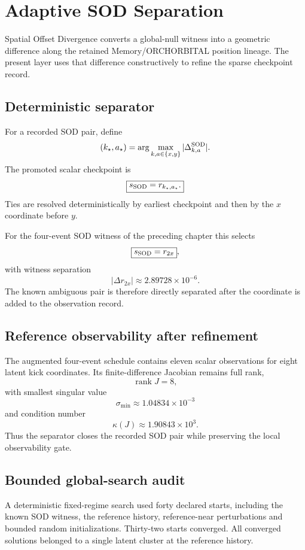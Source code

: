 \chapter{Adaptive SOD Separation}

Spatial Offset Divergence converts a global-null witness into a geometric difference along the retained Memory/ORCHORBITAL position lineage. The present layer uses that difference constructively to refine the sparse checkpoint record.

\section{Deterministic separator}

For a recorded SOD pair, define
\[
(k_\star,a_\star)=\arg\max_{k,a\in\{x,y\}}|\Delta^{\rm SOD}_{k,a}|.
\]
The promoted scalar checkpoint is
\[
\boxed{s_{\rm SOD}=r_{k_\star,a_\star}.}
\]
Ties are resolved deterministically by earliest checkpoint and then by the $x$ coordinate before $y$.

For the four-event SOD witness of the preceding chapter this selects
\[
\boxed{s_{\rm SOD}=r_{2x}},
\]
with witness separation
\[
|\Delta r_{2x}|\approx2.89728\times10^{-6}.
\]
The known ambiguous pair is therefore directly separated after the coordinate is added to the observation record.

\section{Reference observability after refinement}

The augmented four-event schedule contains eleven scalar observations for eight latent kick coordinates. Its finite-difference Jacobian remains full rank,
\[
\operatorname{rank}J=8,
\]
with smallest singular value
\[
\sigma_{\min}\approx1.04834\times10^{-3}
\]
and condition number
\[
\kappa(J)\approx1.90843\times10^3.
\]
Thus the separator closes the recorded SOD pair while preserving the local observability gate.

\section{Bounded global-search audit}

A deterministic fixed-regime search used forty declared starts, including the known SOD witness, the reference history, reference-near perturbations and bounded random initializations. Thirty-two starts converged. All converged solutions belonged to a single latent cluster at the reference history.

